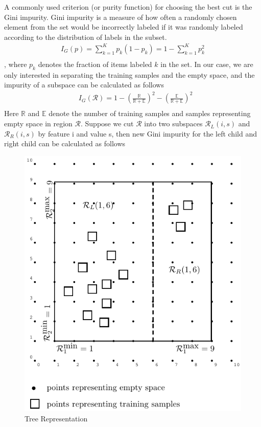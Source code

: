 \documentclass[11pt,onecolumn]{IEEEtran}
\begin{document}
A commonly used criterion (or purity function) for choosing the best cut is the Gini impurity.  Gini impurity is a measure of how often a randomly chosen element from the set would be incorrectly labeled if it was randomly labeled according to the distribution of labels in the subset.  
\begin{align*}
I_G( p)=\sum_{k=1}^Kp_k(1-p_k)=1-\sum_{k=1}^K p_k^2\\
\end{align*}
, where $p_k$ denotes the fraction of items labeled $k$ in the set. In our case,  we are only interested in separating the training samples and the empty space, and the impurity of a subspace can be calculated as follows
\begin{align*}
& I_G(\mathcal R)=1-\left(\frac{\mathbb R}{\mathbb R+\mathbb E}\right)^2 -\left(\frac{\mathbb E}{\mathbb R+\mathbb E}\right)^2\\
\end{align*}
Here $\mathbb R$ and $\mathbb E$ denote the number of training samples and samples representing empty space  in region $\mathcal R$.   Suppose we cut $\mathcal R$ into two subspaces $\mathcal R_L(i,s)$ and $\mathcal R_R(i,s)$ by feature i and value s, then new Gini impurity  for the left child and right child can be calculated as follows


\begin{figure}[h]
    \centering
    \caption{Tree Representation}
    \includegraphics[scale=1]{image/split_example.pdf} 
    \end{figure}
\end{document}
